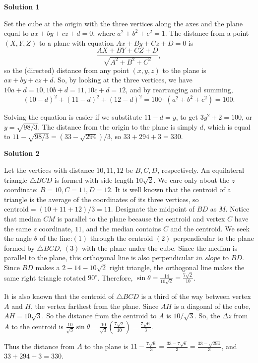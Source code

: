 \begin{enumerate}
\textbf{Solution 1}

Set the cube at the origin with the three vertices along the axes and the plane equal to $ax+by+cz+d=0$, where $a^2+b^2+c^2=1$.  The distance from a point $(X,Y,Z)$ to a plane with equation $Ax+By+Cz+D=0$ is 
 \[\frac{AX+BY+CZ+D}{\sqrt{A^2+B^2+C^2}},\]so the (directed) distance from any point $(x,y,z)$ to the plane is $ax+by+cz+d$.  So, by looking at the three vertices, we have $10a+d=10, 10b+d=11, 10c+d=12$, and by rearranging and summing, 
 \[(10-d)^2+(11-d)^2+(12-d)^2= 100\cdot(a^2+b^2+c^2)=100.\]

 Solving the equation is easier if we substitute $11-d=y$, to get $3y^2+2=100$, or $y=\sqrt {98/3}$.  The distance from the origin to the plane is simply $d$, which is equal to $11-\sqrt{98/3} =(33-\sqrt{294})/3$, so $33+294+3=\boxed{330}$.

 



\textbf{Solution 2}

Let the vertices with distance $10,11,12$ be $B,C,D$, respectively. An equilateral triangle $\triangle BCD$ is formed with side length $10\sqrt{2}$. We care only about the $z$ coordinate: $B=10,C=11,D=12$. It is well known that the centroid of a triangle is the average of the coordinates of its three vertices, so $\text{centroid}=(10+11+12)/3=11$. Designate the midpoint of $BD$ as $M$. Notice that median $CM$ is parallel to the plane because the $\text{centroid}$ and vertex $C$ have the same $z$ coordinate, $11$, and the median contains $C$ and the $\text{centroid}$. We seek the angle $\theta$ of the line:$(1)$ through the centroid $(2)$ perpendicular to the plane formed by $\triangle BCD$, $(3)$ with the plane under the cube. Since the median is parallel to the plane, this orthogonal line is also perpendicular $\textit{in slope}$ to $BD$. Since $BD$ makes a $2-14-10\sqrt{2}$ right triangle, the orthogonal line makes the same right triangle rotated $90^\circ$. Therefore, $\sin\theta=\frac{14}{10\sqrt{2}}=\frac{7\sqrt{2}}{10}$.

 It is also known that the centroid of $\triangle BCD$ is a third of the way between vertex $A$ and $H$, the vertex farthest from the plane. Since $AH$ is a diagonal of the cube, $AH=10\sqrt{3}$. So the distance from the $\text{centroid}$ to $A$ is $10/\sqrt{3}$. So, the $\Delta z$ from $A$ to the centroid is $\frac{10}{\sqrt{3}}\sin\theta=\frac{10}{\sqrt{3}}\left(\frac{7\sqrt{2}}{10}\right)=\frac{7\sqrt{6}}{3}$.

 Thus the distance from $A$ to the plane is $11-\frac{7\sqrt{6}}{3}=\frac{33-7\sqrt{6}}{3}=\frac{33-\sqrt{294}}{3}$, and $33+294+3=\boxed{330}$.


\end{enumerate}
